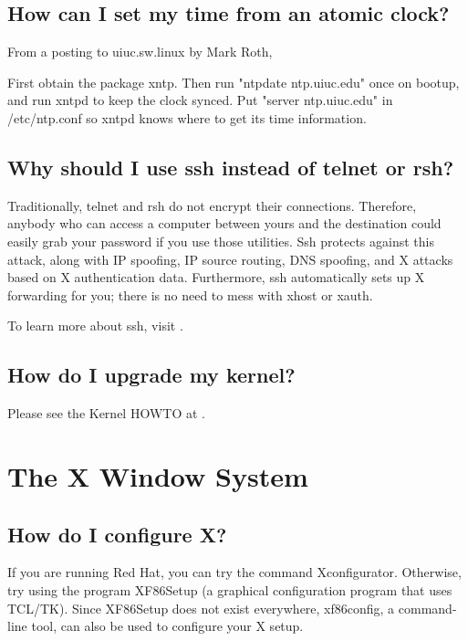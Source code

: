 \documentclass[a4paper]{article}
\begin{document}
\subsection{How can I set my time from an atomic clock?}

From a posting to uiuc.sw.linux by Mark Roth,

First obtain the package xntp.  Then run "ntpdate ntp.uiuc.edu" once
on bootup, and run xntpd to keep the clock synced.  Put "server
ntp.uiuc.edu" in /etc/ntp.conf so xntpd knows where to get its time
information.




\subsection{Why should I use ssh instead of telnet or rsh?}

Traditionally, telnet and rsh do not encrypt their connections.
Therefore, anybody who can access a computer between yours and the
destination could easily grab your password if you use those utilities.
Ssh protects against this attack, along with IP spoofing, IP source
routing, DNS spoofing, and X attacks based on X authentication data.
Furthermore, ssh automatically sets up X forwarding for you; there is no
need to mess with xhost or xauth.

To learn more about ssh, visit .




\subsection{How do I upgrade my kernel?}

Please see the Kernel HOWTO at .




\section{The X Window System}


\subsection{How do I configure X?}

If you are running Red Hat, you can try the command Xconfigurator.
Otherwise, try using the program XF86Setup (a graphical configuration
program that uses TCL/TK).  Since XF86Setup does not exist everywhere,
xf86config, a command-line tool, can also be used to configure your X
setup.
\end{document}
